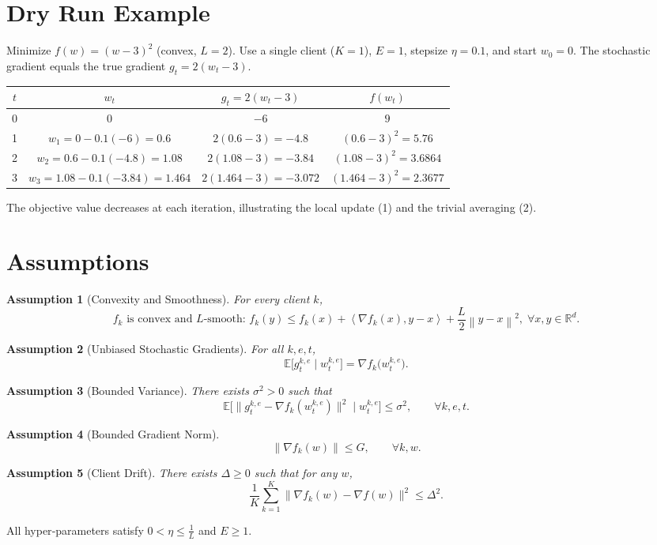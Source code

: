 \documentclass{article}
\newtheorem{assumption}{Assumption}
\newcommand{\E}{\mathbb{E}}
\newcommand{\R}{\mathbb{R}}
\newcommand{\norm}[1]{\left\|#1\right\|}
\newcommand{\inner}[2]{\left\langle #1,#2\right\rangle}
\begin{document}
\section*{Dry Run Example}
Minimize $f(w)=(w-3)^2$ (convex, $L=2$).  Use a single client ($K=1$), $E=1$, stepsize $\eta=0.1$, and start $w_0=0$.
The stochastic gradient equals the true gradient $g_t=2(w_t-3)$.

\begin{center}
\begin{tabular}{c|c|c|c}
$t$ & $w_t$ & $g_t=2(w_t-3)$ & $f(w_t)$\\ \hline
0 & $0$ & $-6$ & $9$\\
1 & $w_1=0-0.1(-6)=0.6$ & $2(0.6-3)=-4.8$ & $(0.6-3)^2=5.76$\\
2 & $w_2=0.6-0.1(-4.8)=1.08$ & $2(1.08-3)=-3.84$ & $(1.08-3)^2=3.6864$\\
3 & $w_3=1.08-0.1(-3.84)=1.464$ & $2(1.464-3)=-3.072$ & $(1.464-3)^2=2.3677$
\end{tabular}
\end{center}
The objective value decreases at each iteration, illustrating the local update (1) and the trivial averaging (2).

\newpage
\section*{Assumptions}
\begin{assumption}[Convexity and Smoothness]\label{as:convex}
For every client $k$,
\[
f_k \text{ is convex and } L\text{-smooth: } 
f_k(y)\le f_k(x)+\inner{\nabla f_k(x)}{y-x}+\frac{L}{2}\norm{y-x}^2,\;\forall x,y\in\R^d .
\]
\end{assumption}
\begin{assumption}[Unbiased Stochastic Gradients]\label{as:unbiased}
For all $k,e,t$,
\[
\E\!\big[g_{t}^{k,e}\mid w_{t}^{k,e}\big]=\nabla f_k\!\big(w_{t}^{k,e}\big).
\]
\end{assumption}
\begin{assumption}[Bounded Variance]\label{as:variance}
There exists $\sigma^2>0$ such that
\[
\E\!\big[\|g_{t}^{k,e}-\nabla f_k(w_{t}^{k,e})\|^2\mid w_{t}^{k,e}\big]\le\sigma^2,\qquad\forall k,e,t.
\]
\end{assumption}
\begin{assumption}[Bounded Gradient Norm]\label{as:gradbound}
\[
\|\nabla f_k(w)\|\le G,\qquad\forall k,w.
\]
\end{assumption}
\begin{assumption}[Client Drift]\label{as:drift}
There exists $\Delta\ge0$ such that for any $w$,
\[
\frac1K\sum_{k=1}^K\big\|\nabla f_k(w)-\nabla f(w)\big\|^2\le\Delta^2 .
\]
\end{assumption}
All hyper‑parameters satisfy $0<\eta\le \frac{1}{L}$ and $E\ge1$.
\end{document}
